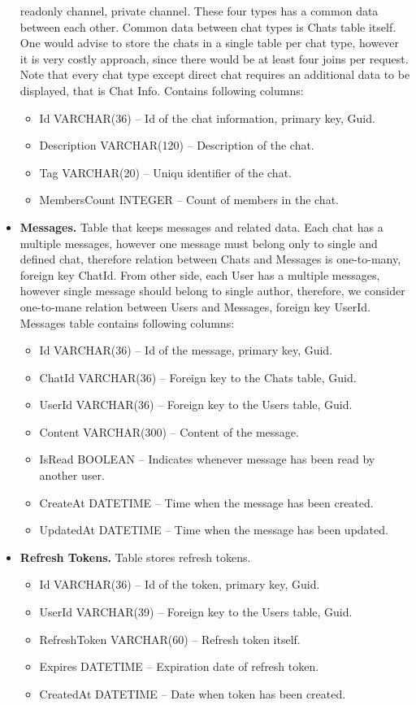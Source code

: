 \begin{itemize}
    readonly channel, private channel.
    These four types has a common data between each other.
    Common data between chat types is Chats table itself.
    One would advise to store the chats in a single table per chat type, however it is very costly approach, since there
    would be at least four joins per request.
    Note that every chat type except direct chat requires an additional data to be displayed, that is Chat Info.
    Contains following columns:
    \begin{itemize}
        \item Id VARCHAR(36) -- Id of the chat information, primary key, Guid.
        \item Description VARCHAR(120) -- Description of the chat.
        \item Tag VARCHAR(20) -- Uniqu identifier of the chat.
        \item MembersCount INTEGER -- Count of members in the chat.
    \end{itemize}
    \item \textbf{Messages.} Table that keeps messages and related data.
    Each chat has a multiple messages, however one message must belong only to single and defined chat,
    therefore relation between Chats and Messages is one-to-many, foreign key ChatId.
    From other side, each User has a multiple messages, however single message should belong to single author,
    therefore, we consider one-to-mane relation between Users and Messages, foreign key UserId.
    Messages table contains following columns:
    \begin{itemize}
        \item Id VARCHAR(36) -- Id of the message, primary key, Guid.
        \item ChatId VARCHAR(36) -- Foreign key to the Chats table, Guid.
        \item UserId VARCHAR(36) -- Foreign key to the Users table, Guid.
        \item Content VARCHAR(300) -- Content of the message.
        \item IsRead BOOLEAN -- Indicates whenever message has been read by another user.
        \item CreateAt DATETIME -- Time when the message has been created.
        \item UpdatedAt DATETIME -- Time when the message has been updated.
    \end{itemize}
    \item \textbf{Refresh Tokens.} Table stores refresh tokens.
    \begin{itemize}
        \item Id VARCHAR(36) -- Id of the token, primary key, Guid.
        \item UserId VARCHAR(39) -- Foreign key to the Users table, Guid.
        \item RefreshToken VARCHAR(60) -- Refresh token itself.
        \item Expires DATETIME -- Expiration date of refresh token.
        \item CreatedAt DATETIME -- Date when token has been created.
    \end{itemize}
\end{itemize}
